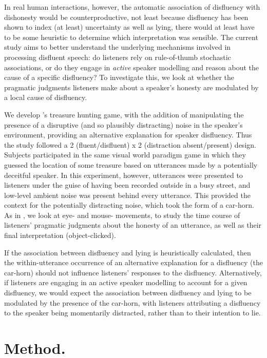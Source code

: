 \documentclass[a4paper,man,natbib]{apa6}
\newcommand*{\term}[1]{\emph{#1}} %
\newcommand*{\citegen}[1]{\citeauthor{#1}'s \citeyear{#1}}
\begin{document}
In real human interactions, however, the automatic association of disfluency with dishonesty would be counterproductive, not least because disfluency has been shown to index (at least) uncertainty as well as lying, there would at least have to be some heuristic to determine which interpretation was sensible.
The current study aims to better understand the underlying mechanisms involved in processing disfluent speech: do listeners rely on rule-of-thumb stochastic associations, or do they engage in \term{active} speaker modelling and reason about the cause of a specific disfluency? 
To investigate this, we look at whether the pragmatic judgments listeners make about a speaker's honesty are modulated by a local cause of disfluency. 


We develop \citegen{Loy2016} treasure hunting game, with the addition of manipulating the presence of a disruptive (and so plausibly distracting) noise in the speaker's environment, providing an alternative explanation for speaker disfluency.
Thus the study followed a 2 (fluent/disfluent) x 2 (distraction absent/present) design.
Subjects participated in the same visual world paradigm game in which they guessed the location of some treasure based on utterances made by a potentially deceitful speaker.
In this experiment, however, utterances were presented to listeners under the guise of having been recorded outside in a busy street, and low-level ambient noise was present behind every utterance.
This provided the context for the potentially distracting noise, which took the form of a car-horn. 
As in \citet{Loy2016}, we look at eye- and mouse- movements, to study the time course of listeners' pragmatic judgments about the honesty of an utterance, as well as their final interpretation (object-clicked).


If the association between disfluency and lying is heuristically calculated, then the within-utterance occurrence of an alternative explanation for a disfluency (the car-horn) should not influence listeners' responses to the disfluency.
Alternatively, if listeners are engaging in an active speaker modelling to account for a given disfluency, we would expect the association between disfluency and lying to be modulated by the presence of the car-horn, with listeners attributing a disfluency to the speaker being momentarily distracted, rather than to their intention to lie.


\section{Method.}
\end{document}

